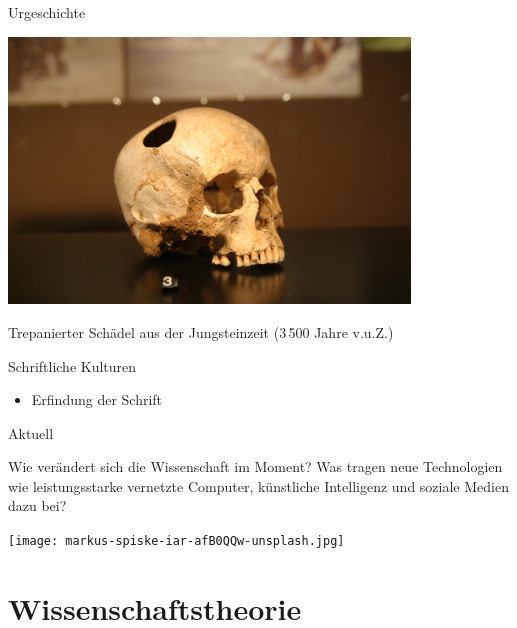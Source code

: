 \documentclass{beamer}
\begin{document}
\begin{frame}{Urgeschichte}

\begin{center}
    \includegraphics[width=0.8\textwidth]{Crane-trepanation-img_0507.jpg}
\end{center}

Trepanierter Schädel aus der Jungsteinzeit (3\,500 Jahre v.u.Z.)

\end{frame}

\begin{frame}{Schriftliche Kulturen}

\begin{itemize}
    \item 
Erfindung der Schrift 
\end{itemize}

\end{frame}


\begin{frame}{Aktuell}

Wie verändert sich die Wissenschaft im Moment? Was tragen neue Technologien wie leistungsstarke vernetzte Computer, künstliche Intelligenz und soziale Medien dazu bei?

\centering

\texttt{[image: markus-spiske-iar-afB0QQw-unsplash.jpg]}
    
\end{frame}


\section{Wissenschaftstheorie}
\end{document}
